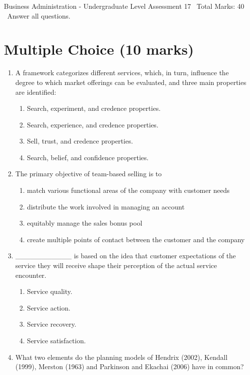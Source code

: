 \documentclass[12pt]{article}
\begin{document}
\begin{center}
Business Administration - Undergraduate Level Assessment 17 \
Total Marks: 40 \
Answer all questions.
\end{center}

\section*{Multiple Choice (10 marks)}
\begin{enumerate}[label=\arabic*.]
\item A framework categorizes different services, which, in turn, influence the degree to which market offerings can be evaluated, and three main properties are identified:
\begin{enumerate}[label=(\alph*)]
    \item Search, experiment, and credence properties.
    \item Search, experience, and credence properties.
    \item Sell, trust, and credence properties.
    \item Search, belief, and confidence properties.
\end{enumerate}
\item The primary objective of team-based selling is to
\begin{enumerate}[label=(\alph*)]
    \item match various functional areas of the company with customer needs
    \item distribute the work involved in managing an account
    \item equitably manage the sales bonus pool
    \item create multiple points of contact between the customer and the company
\end{enumerate}
\item \_\_\_\_\_\_\_\_\_\_\_ is based on the idea that customer expectations of the service they will receive shape their perception of the actual service encounter.
\begin{enumerate}[label=(\alph*)]
    \item Service quality.
    \item Service action.
    \item Service recovery.
    \item Service satisfaction.
\end{enumerate}
\item What two elements do the planning models of Hendrix (2002), Kendall (1999), Merston (1963) and Parkinson and Ekachai (2006) have in common?

\end{enumerate}
\end{document}
